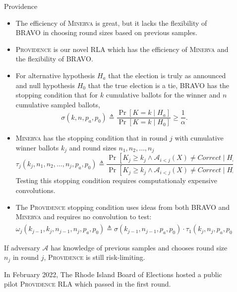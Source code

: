 \documentclass[final]{beamer}
\newcommand{\Minerva}{\textsc{Minerva}\xspace}
\newcommand{\Prov}{\textsc{Providence}\xspace}
\newcommand{\BRAVO}{\textsc{BRAVO}\xspace}
\newlength{\sepwidth}
\newlength{\colwidth}
\newcommand{\separatorcolumn}{\begin{column}{\sepwidth}\end{column}}
\begin{document}
\begin{frame}[t]
\begin{columns}[t]
\begin{column}{\colwidth}
\end{column}

\separatorcolumn

\begin{column}{\colwidth}
\begin{block}{Providence}

\begin{itemize}
\item
The efficiency of \Minerva is great, but it lacks the flexibility of \BRAVO in choosing round sizes based on previous samples.
\item
\Prov is our novel RLA which has the efficiency of \Minerva and the flexibility of \BRAVO.
\item For alternative hypothesis $H_a$ that the election is truly as announced and null
hypothesis $H_0$ that the true election is a tie, \BRAVO has the stopping condition that
for $k$ cumulative ballots for the winner and $n$ cumulative sampled ballots,
$$\sigma(k,n,p_a,p_0) \triangleq \frac{\Pr[K=k\mid H_a]}{\Pr[K=k\mid H_0]}\ge \frac{1}{\alpha}.$$
\item \Minerva has the stopping condition that in round $j$ with cumulative winner ballots $k_j$ and round sizes $n_1,n_2,\ldots,n_j$
$$\tau_j(k_j,n_1,n_2,\ldots,n_j,p_a,p_0) \triangleq \frac{\Pr[K_j\ge k_j \wedge \mathcal{A}_{i<j}(X)\neq Correct \mid H_a]}{\Pr[K_j\ge k_j \wedge \mathcal{A}_{i<j}(X)\neq Correct \mid H_0]}\ge \frac{1}{\alpha}.$$ Testing this stopping condition requires computationaly expensive convolutions.
\item The \Prov stopping condition uses ideas from both \BRAVO and \Minerva and requires no convolution to test:
$$\omega_j(k_{j-1},k_j,n_{j-1},n_j,p_a,p_0)\triangleq \sigma(k_{j-1},n_{j-1},p_a,p_0)\cdot \tau_1(k_j,n_j,p_a,p_0) \ge \frac{1}{\alpha}.$$ 

\end{itemize}

If adversary $\mathcal{A}$ has knowledge of previous samples and chooses round size $n_j$ in round $j$, 
\Prov is still risk-limiting.

\heading {\Prov pilot}
In February 2022, The Rhode Island Board of Elections hosted a public pilot \Prov RLA which passed 
in the first round.


\end{block}
\end{column}
\end{columns}
\end{frame}
\end{document}
